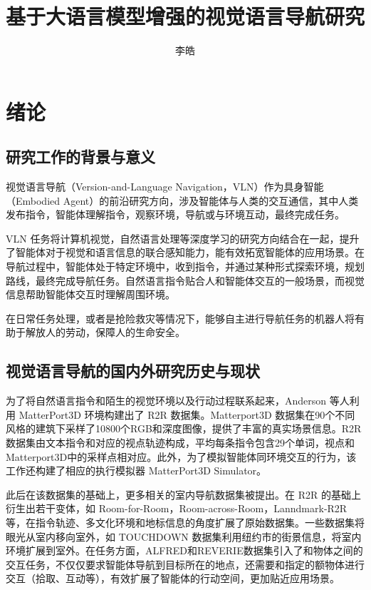 \documentclass[bachelor]{thesis-uestc}
\title{基于大语言模型增强的视觉语言导航研究}{TODO}
\author{李皓}{Li Hao}
\begin{document}
\makecover

\begin{chineseabstract}


\chinesekeyword{}
\end{chineseabstract}

\begin{englishabstract}

\englishkeyword{}
\end{englishabstract}

\thesistableofcontents

\chapter{绪\hspace{6pt}论}

\section{研究工作的背景与意义}


视觉语言导航（Version-and-Language Navigation，VLN）作为具身智能（Embodied Agent）的前沿研究方向，涉及智能体与人类的交互通信，其中人类发布指令，智能体理解指令，观察环境，导航或与环境互动，最终完成任务。

VLN 任务将计算机视觉，自然语言处理等深度学习的研究方向结合在一起，提升了智能体对于视觉和语言信息的联合感知能力，能有效拓宽智能体的应用场景。在导航过程中，智能体处于特定环境中，收到指令，并通过某种形式探索环境，规划路线，最终完成导航任务。自然语言指令贴合人和智能体交互的一般场景，而视觉信息帮助智能体交互时理解周围环境。

在日常任务处理，或者是抢险救灾等情况下，能够自主进行导航任务的机器人将有助于解放人的劳动，保障人的生命安全。


\section{视觉语言导航的国内外研究历史与现状}
为了将自然语言指令和陌生的视觉环境以及行动过程联系起来，Anderson 等人利用 MatterPort3D 环境构建出了 R2R 数据集。Matterport3D 数据集在90个不同风格的建筑下采样了10800个RGB和深度图像，提供了丰富的真实场景信息。R2R 数据集由文本指令和对应的视点轨迹构成，平均每条指令包含29个单词，视点和Matterport3D中的采样点相对应。此外，为了模拟智能体同环境交互的行为，该工作还构建了相应的执行模拟器 MatterPort3D Simulator。

此后在该数据集的基础上，更多相关的室内导航数据集被提出。在 R2R 的基础上衍生出若干变体，如 Room-for-Room，Room-across-Room，Lanndmark-R2R等，在指令轨迹、多文化环境和地标信息的角度扩展了原始数据集。一些数据集将眼光从室内移向室外，如 TOUCHDOWN 数据集利用纽约市的街景信息，将室内环境扩展到室外。在任务方面，ALFRED和REVERIE数据集引入了和物体之间的交互任务，不仅仅要求智能体导航到目标所在的地点，还需要和指定的额物体进行交互（拾取、互动等），有效扩展了智能体的行动空间，更加贴近应用场景。
\end{document}

